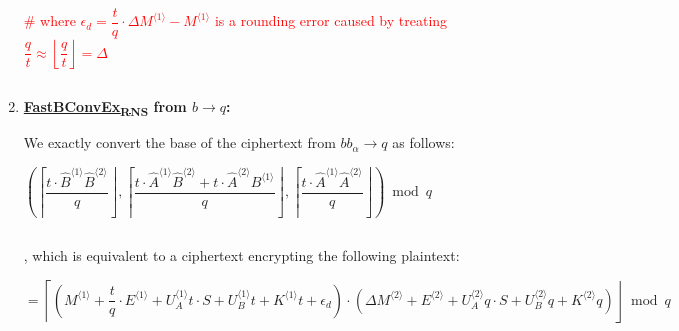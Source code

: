 \begin{enumerate}
\textcolor{red}{ \# where $\epsilon_d = \dfrac{t}{q}\cdot \Delta M^{\langle 1 \rangle} - M^{\langle 1 \rangle}$ is a rounding error caused by treating $\dfrac{q}{t} \approx \left\lfloor\dfrac{q}{t}\right\rfloor = \Delta$}



$ $












\item \textbf{\underline{\textsf{FastBConvEx\textsubscript{RNS}}} from $b \rightarrow q$:} 

We exactly convert the base of the ciphertext from $bb_\alpha \rightarrow q$ as follows:

$\left(\left\lceil\dfrac{t\cdot\hat{B}^{\langle 1 \rangle}\hat{B}^{\langle 2 \rangle}}{q}\right\rfloor, \left\lceil\dfrac{t\cdot\hat{A}^{\langle 1 \rangle}\hat{B}^{\langle 2 \rangle} + t\cdot\hat{A}^{\langle 2 \rangle}B^{\langle 1 \rangle}}{q}\right\rfloor, \left\lceil\dfrac{t\cdot\hat{A}^{\langle 1 \rangle}\hat{A}^{\langle 2 \rangle}}{q}\right\rfloor\right) \bmod q$

$ $

, which is equivalent to a ciphertext encrypting the following plaintext:


$= \left\lceil (M^{\langle 1 \rangle} + \dfrac{t}{q}\cdot E^{\langle 1 \rangle} + U_A^{\langle 1 \rangle}t \cdot S + U_B^{\langle 1 \rangle}t + K^{\langle 1 \rangle} t + \epsilon_d)\cdot(\Delta M^{\langle 2 \rangle} + E^{\langle 2 \rangle} + U_A^{\langle 2 \rangle}q \cdot S + U_B^{\langle 2 \rangle}q + K^{\langle 2 \rangle} q)\right\rfloor \bmod q$


\end{enumerate}
